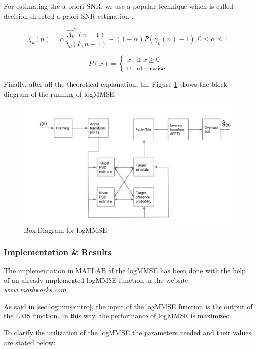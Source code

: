 \documentclass[11pt,a4paper,english]{book}  %
\theoremstyle{definition}  %
\theoremstyle{plain}  %
\theoremstyle{remark}  %
\begin{document}
	
	For estimating the a priori SNR, we use a popular technique which is called decision-directed a priori SNR estimation \cite{speech}.
	
		\begin{equation}
		\hat{\xi_{k}}(n)= \alpha \frac{\hat{A_{k}}^2 (n-1)}{\lambda_{d} (k,n-1)} + (1-\alpha) P(\gamma_{k}(n)-1), 0 \leq \alpha \leq 1
	\end{equation}
	
	
	\[
 P(x) =
  \begin{cases}
   x & \text{if } x \geq 0 \\
   0       & \text{otherwise}
  \end{cases}
\]

Finally, after all the theoretical explanation, the Figure \ref{fig:boxesmmse} shows the block diagram of the running of logMMSE.

		
		\begin{figure}[h]
		\centering
		\includegraphics[width=15cm]{images/theory/logmmseboxes.jpg}
		\caption{Box Diagram for logMMSE}
		\label{fig:boxesmmse}
		\end{figure}
	
	\subsubsection{Implementation \& Results}

The implementation in MATLAB of the logMMSE has been done with the help of an already implemented logMMSE function in the website \textit{www.mathworks.com}.

As said in \ref{sec:logmmseintro}, the input of the logMMSE function is the output of the LMS function. In this way, the performance of logMMSE is maximized.

To clarify the utilization of the logMMSE the parameters needed and their values are stated below:
\end{document}
